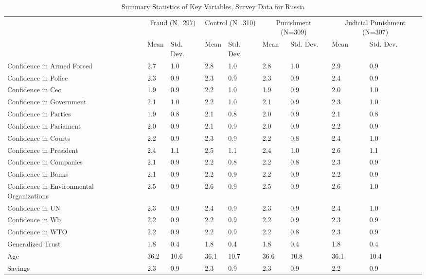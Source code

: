 \begin{table}

\caption{Summary Statistics of Key Variables, Survey Data for Russia}
\centering
\begin{tabular}[t]{llllllllll}
\toprule
\multicolumn{2}{c}{ } & \multicolumn{2}{c}{Fraud (N=297)} & \multicolumn{2}{c}{Control (N=310)} & \multicolumn{2}{c}{Punishment (N=309)} & \multicolumn{2}{c}{Judicial Punishment (N=307)} \\
\cmidrule(l{3pt}r{3pt}){3-4} \cmidrule(l{3pt}r{3pt}){5-6} \cmidrule(l{3pt}r{3pt}){7-8} \cmidrule(l{3pt}r{3pt}){9-10}
  &    & Mean & Std. Dev. & Mean  & Std. Dev.  & Mean   & Std. Dev.   & Mean    & Std. Dev.   \\
\midrule
Confidence in Armed Forced &  & 2.7 & 1.0 & 2.8 & 1.0 & 2.8 & 1.0 & 2.9 & 0.9\\
Confidence in Police &  & 2.3 & 0.9 & 2.3 & 0.9 & 2.3 & 0.9 & 2.4 & 0.9\\
Confidence in Cec &  & 1.9 & 0.9 & 2.2 & 1.0 & 1.9 & 0.9 & 2.0 & 1.0\\
Confidence in Government &  & 2.1 & 1.0 & 2.2 & 1.0 & 2.1 & 0.9 & 2.3 & 1.0\\
Confidence in Parties &  & 1.9 & 0.8 & 2.1 & 0.8 & 2.0 & 0.9 & 2.1 & 0.8\\
Confidence in Pariament &  & 2.0 & 0.9 & 2.1 & 0.9 & 2.0 & 0.9 & 2.2 & 0.9\\
Confidence in Courts &  & 2.2 & 0.9 & 2.3 & 0.9 & 2.2 & 0.8 & 2.4 & 1.0\\
Confidence in President &  & 2.4 & 1.1 & 2.5 & 1.1 & 2.4 & 1.0 & 2.6 & 1.1\\
Confidence in Companies &  & 2.1 & 0.9 & 2.2 & 0.8 & 2.2 & 0.8 & 2.3 & 0.9\\
Confidence in Banks &  & 2.1 & 0.9 & 2.2 & 0.9 & 2.2 & 0.9 & 2.2 & 0.9\\
Confidence in Environmental Organizations &  & 2.5 & 0.9 & 2.6 & 0.9 & 2.5 & 0.9 & 2.6 & 1.0\\
Confidence in UN &  & 2.3 & 0.9 & 2.4 & 0.9 & 2.3 & 0.9 & 2.4 & 1.0\\
Confidence in Wb &  & 2.2 & 0.9 & 2.2 & 0.9 & 2.2 & 0.9 & 2.3 & 0.9\\
Confidence in WTO &  & 2.2 & 0.9 & 2.2 & 0.9 & 2.2 & 0.8 & 2.3 & 0.9\\
Generalized Trust &  & 1.8 & 0.4 & 1.8 & 0.4 & 1.8 & 0.4 & 1.8 & 0.4\\
Age &  & 36.2 & 10.6 & 36.1 & 10.7 & 36.6 & 10.8 & 36.1 & 10.4\\
Savings &  & 2.3 & 0.9 & 2.3 & 0.9 & 2.3 & 0.9 & 2.2 & 0.9\\

\end{tabular}
\end{table}
